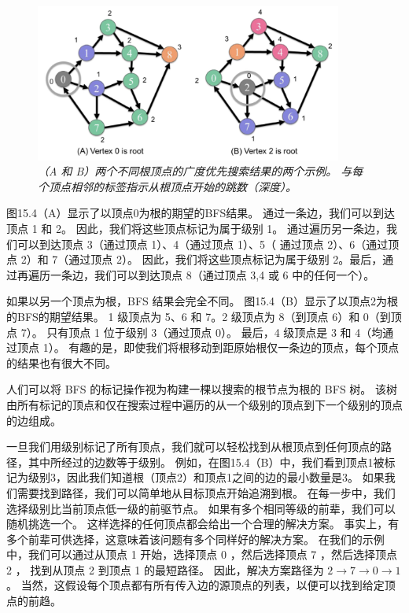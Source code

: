 \begin{figure}[H]
	\centering
	\includegraphics[width=0.9\textwidth]{figs/F15.4.png}
	\caption{\textit{（A 和 B）两个不同根顶点的广度优先搜索结果的两个示例。 
	与每个顶点相邻的标签指示从根顶点开始的跳数（深度）。}}
\end{figure}

图15.4（A）显示了以顶点0为根的期望的BFS结果。 通过一条边，我们可以到达顶点 1 和 2。
因此，我们将这些顶点标记为属于级别 1。
通过遍历另一条边，我们可以到达顶点 3（通过顶点 1）、4（通过顶点 1）、5（ 通过顶点 2）、6（通过顶点 2）和 7（通过顶点 2）。 
因此，我们将这些顶点标记为属于级别 2。最后，通过再遍历一条边，我们可以到达顶点 8（通过顶点 3,4 或 6 中的任何一个）。

如果以另一个顶点为根，BFS 结果会完全不同。 图15.4（B）显示了以顶点2为根的BFS的期望结果。 
1 级顶点为 5、6 和 7。2 级顶点为 8（到顶点 6）和 0（到顶点 7）。 只有顶点 1 位于级别 3（通过顶点 0）。 
最后，4 级顶点是 3 和 4（均通过顶点 1）。 有趣的是，即使我们将根移动到距原始根仅一条边的顶点，每个顶点的结果也有很大不同。

人们可以将 BFS 的标记操作视为构建一棵以搜索的根节点为根的 BFS 树。 
该树由所有标记的顶点和仅在搜索过程中遍历的从一个级别的顶点到下一个级别的顶点的边组成。

一旦我们用级别标记了所有顶点，我们就可以轻松找到从根顶点到任何顶点的路径，其中所经过的边数等于级别。 
例如，在图15.4（B）中，我们看到顶点1被标记为级别3，因此我们知道根（顶点2）和顶点1之间的边的最小数量是3。 
如果我们需要找到路径，我们可以简单地从目标顶点开始追溯到根。 在每一步中，我们选择级别比当前顶点低一级的前驱节点。 
如果有多个相同等级的前辈，我们可以随机挑选一个。 这样选择的任何顶点都会给出一个合理的解决方案。 
事实上，有多个前辈可供选择，这意味着该问题有多个同样好的解决方案。 
在我们的示例中，我们可以通过从顶点 1 开始，选择顶点 0 ，然后选择顶点 7 ，然后选择顶点 2 ，
找到从顶点 2 到顶点 1 的最短路径。 因此，解决方案路径为 $2 \rightarrow 7 \rightarrow 0 \rightarrow 1$。 
当然，这假设每个顶点都有所有传入边的源顶点的列表，以便可以找到给定顶点的前趋。

